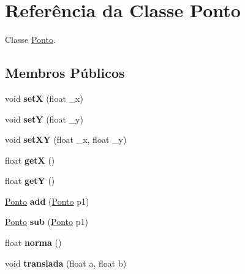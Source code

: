 \hypertarget{classPonto}{}\section{Referência da Classe Ponto}
\label{classPonto}


Classe \mbox{\hyperlink{classPonto}{Ponto}}.  


\subsection*{Membros Públicos}
\begin{DoxyCompactItemize}
\item 
\mbox{\label{classPonto_a22129ad4dbf8019c479021d70a9f6774}} 
void {\bfseries setX} (float \+\_\+x)
\item 
\mbox{\label{classPonto_a2d9e5b9fade9d3f3f21122a2dc2f5e11}} 
void {\bfseries setY} (float \+\_\+y)
\item 
\mbox{\label{classPonto_a827488219a7da184d440f687cec49ce6}} 
void {\bfseries set\+XY} (float \+\_\+x, float \+\_\+y)
\item 
\mbox{\label{classPonto_ae4823d6ee26ff3448ee403d26a3c6d2f}} 
float {\bfseries getX} ()
\item 
\mbox{\label{classPonto_ab120600953e6544301223b9b05a43ee5}} 
float {\bfseries getY} ()
\item 
\mbox{\label{classPonto_abb68d6122278de262e8ed1c70714e3d9}} 
\mbox{\hyperlink{classPonto}{Ponto}} {\bfseries add} (\mbox{\hyperlink{classPonto}{Ponto}} p1)
\item 
\mbox{\label{classPonto_a8404fcad0fca2ce768ab9e1550f5d3a0}} 
\mbox{\hyperlink{classPonto}{Ponto}} {\bfseries sub} (\mbox{\hyperlink{classPonto}{Ponto}} p1)
\item 
\mbox{\label{classPonto_a9b0ddbdddd05edbc4d45ef0671a628c6}} 
float {\bfseries norma} ()
\item 
\mbox{\label{classPonto_a96a4395204ec010814e67d20705e630f}} 
void {\bfseries translada} (float a, float b)
\item 

\end{DoxyCompactItemize}
